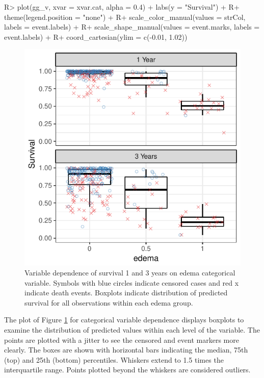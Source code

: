 \documentclass[article]{jss}
\begin{document}
\begin{Schunk}
\begin{Sinput}
R> plot(gg_v, xvar = xvar.cat, alpha = 0.4) + labs(y = "Survival") +
R+   theme(legend.position = "none") +
R+   scale_color_manual(values = strCol, labels = event.labels) +
R+   scale_shape_manual(values = event.marks, labels = event.labels) +
R+   coord_cartesian(ylim = c(-0.01, 1.02))
\end{Sinput}
\begin{figure}[!htb]

{\centering \includegraphics{fig-rfs/rfs-variable-plotCat-1} 

}

\caption[Variable dependence of survival 1 and 3 years on edema categorical variable]{Variable dependence of survival 1 and 3 years on edema categorical variable. Symbols with blue circles indicate censored cases and red x indicate death events. Boxplots indicate distribution of predicted survival for all observations within each edema group.}\label{fig:variable-plotCat}
\end{figure}
\end{Schunk}

The  plot of Figure \ref{fig:variable-plotCat} for
categorical variable dependence displays boxplots to examine the
distribution of predicted values within each level of the variable. The
points are plotted with a jitter to see the censored and event markers
more clearly. The boxes are shown with horizontal bars indicating the
median, 75th (top) and 25th (bottom) percentiles. Whiskers extend to 1.5
times the interquartile range. Points plotted beyond the whiskers are
considered outliers.
\end{document}
